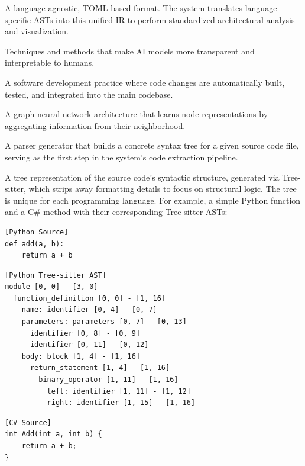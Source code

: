 \begin{description}[style=multiline, leftmargin=3cm, font=\normalfont, itemsep=1em]
    \item[\textbf{Intermediate Representation (IR)}] A language-agnostic, TOML-based format. The system translates language-specific ASTs into this unified IR to perform standardized architectural analysis and visualization.

    \item[\textbf{Explainable AI (XAI)}] Techniques and methods that make AI models more transparent and interpretable to humans.

    \item[\textbf{Continuous Integration (CI)}] A software development practice where code changes are automatically built, tested, and integrated into the main codebase.

    \item[\textbf{GraphSAGE}] A graph neural network architecture that learns node representations by aggregating information from their neighborhood.

    \item[\textbf{Tree-sitter}] A parser generator that builds a concrete syntax tree for a given source code file, serving as the first step in the system's code extraction pipeline.

    \item[\textbf{Abstract Syntax Tree (AST)}] A tree representation of the source code's syntactic structure, generated via Tree-sitter, which strips away formatting details to focus on structural logic.
    The tree is unique for each programming language. For example, a simple Python function and a C\# method with their corresponding Tree-sitter ASTs:
{\footnotesize
\begin{verbatim}
[Python Source]
def add(a, b):
    return a + b
\end{verbatim}
}

{\footnotesize
\begin{verbatim}
[Python Tree-sitter AST]
module [0, 0] - [3, 0]
  function_definition [0, 0] - [1, 16]
    name: identifier [0, 4] - [0, 7]
    parameters: parameters [0, 7] - [0, 13]
      identifier [0, 8] - [0, 9]
      identifier [0, 11] - [0, 12]
    body: block [1, 4] - [1, 16]
      return_statement [1, 4] - [1, 16]
        binary_operator [1, 11] - [1, 16]
          left: identifier [1, 11] - [1, 12]
          right: identifier [1, 15] - [1, 16]
\end{verbatim}
}
{\footnotesize
\begin{verbatim}
[C# Source]
int Add(int a, int b) {
    return a + b;
}
\end{verbatim}
}


\end{description}
